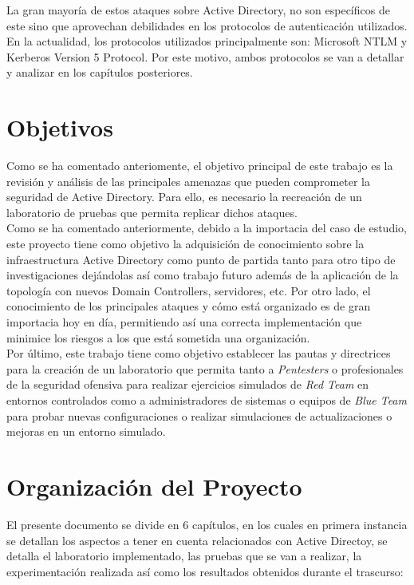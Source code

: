 La gran mayoría de estos ataques sobre Active Directory, no son específicos de este sino que aprovechan debilidades en los protocolos de autenticación utilizados. En la actualidad, los protocolos utilizados principalmente son: Microsoft NTLM y Kerberos Version 5 Protocol. Por este motivo, ambos protocolos se van a detallar y analizar en los capítulos posteriores. \\

\section{Objetivos}

Como se ha comentado anteriomente, el objetivo principal de este trabajo es la revisión y análisis de las principales amenazas que pueden comprometer la seguridad de Active Directory. Para ello, es necesario la recreación de un laboratorio de pruebas que permita replicar dichos ataques.\\

Como se ha comentado anteriormente, debido a la importacia del caso de estudio, este proyecto tiene como objetivo la adquisición de conocimiento sobre la infraestructura Active Directory como punto de partida tanto para otro tipo de investigaciones dejándolas así como trabajo futuro además de la aplicación de la topología con nuevos Domain Controllers, servidores, etc. Por otro lado, el conocimiento de los principales ataques y cómo está organizado es de gran importacia hoy en día, permitiendo así una correcta implementación que minimice los riesgos a los que está sometida una organización. \\

Por último, este trabajo tiene como objetivo establecer las pautas y directrices para la creación de un laboratorio que permita tanto a {\it Pentesters} o profesionales de la seguridad ofensiva para realizar ejercicios simulados de {\it Red Team} en entornos controlados como a administradores de sistemas o equipos de {\it Blue Team} para probar nuevas configuraciones o realizar simulaciones de actualizaciones o mejoras en un entorno simulado. 

\section{Organización del Proyecto}

El presente documento se divide en 6 capítulos, en los cuales en primera instancia se detallan los aspectos a tener en cuenta relacionados con Active Directoy, se detalla el laboratorio implementado, las pruebas que se van a realizar, la experimentación realizada así como los resultados obtenidos durante el trascurso:\\

